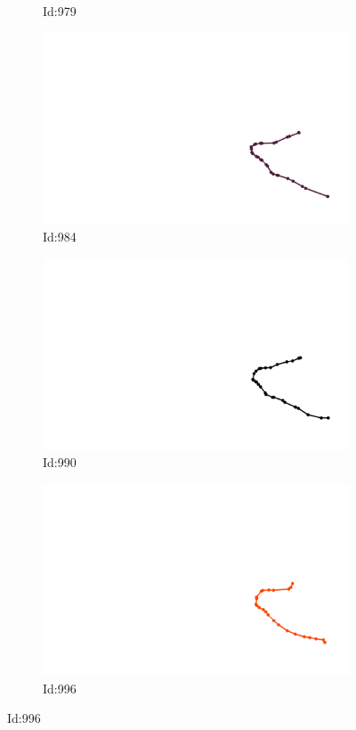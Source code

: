 \documentclass[12pt,twoside]{report}
\begin{document}
\begin{figure}
\begin{subfigure}[b]{0.20\textwidth}
\caption{Id:979}
\end{subfigure}
\begin{subfigure}[b]{0.20\textwidth}
\centering
\includegraphics[width=\textwidth]{../trajectories/984.png}
\caption{Id:984}
\end{subfigure}
\begin{subfigure}[b]{0.20\textwidth}
\centering
\includegraphics[width=\textwidth]{../trajectories/990.png}
\caption{Id:990}
\end{subfigure}
\begin{subfigure}[b]{0.20\textwidth}
\centering
\includegraphics[width=\textwidth]{../trajectories/996.png}
\caption{Id:996}
\end{subfigure}
\end{figure}
\end{document}

